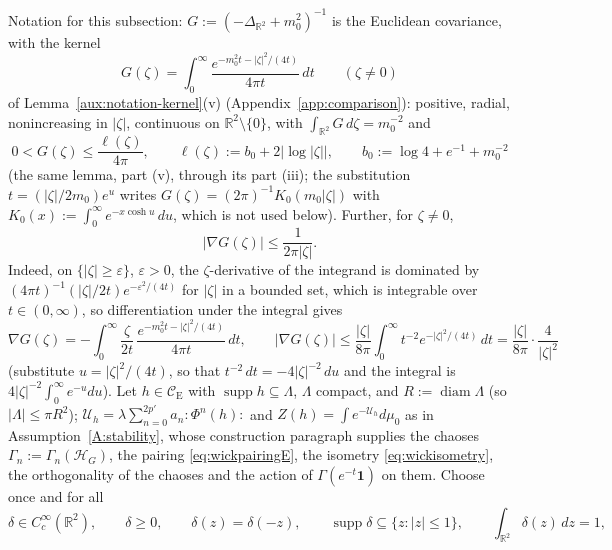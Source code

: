 \documentclass[11pt,a4paper]{article}
\theoremstyle{plain}
\theoremstyle{definition}
\theoremstyle{plain}
\theoremstyle{definition}
\newcommand{\R}{\mathbb{R}}
\newcommand{\CE}{\mathcal{C}_{\mathrm E}}
\newcommand{\HH}{\mathcal{H}}
\DeclareMathOperator{\supp}{supp}
\begin{document}
Notation for this subsection: $G:=(-\Delta_{\R^2}+m_0^2)^{-1}$ is the Euclidean
covariance, with the kernel
\[
 G(\zeta)=\int_0^\infty\frac{e^{-m_0^2t-|\zeta|^2/(4t)}}{4\pi t}\,dt\qquad(\zeta\ne0)
\]
of Lemma~\ref{aux:notation-kernel}(v) (Appendix~\ref{app:comparison}): positive, radial,
nonincreasing in $|\zeta|$, continuous on $\R^2\setminus\{0\}$, with
$\int_{\R^2}G\,d\zeta=m_0^{-2}$ and
\begin{equation}
 0<G(\zeta)\le\frac{\ell(\zeta)}{4\pi},\qquad
 \ell(\zeta):=b_0+2\bigl|\log|\zeta|\bigr|,\qquad
 b_0:=\log4+e^{-1}+m_0^{-2}
 \tag{C.a}\label{eq:Glog}
\end{equation}
(the same lemma, part (v), through its part (iii); the substitution $t=(|\zeta|/2m_0)e^{u}$ writes
$G(\zeta)=(2\pi)^{-1}K_0(m_0|\zeta|)$ with $K_0(x):=\int_0^\infty e^{-x\cosh u}\,du$,
which is not used below).  Further, for $\zeta\ne0$,
\begin{equation}
 |\nabla G(\zeta)|\le\frac1{2\pi|\zeta|} .
 \tag{C.b}\label{eq:Ggrad}
\end{equation}
Indeed, on $\{|\zeta|\ge\varepsilon\}$, $\varepsilon>0$, the $\zeta$-derivative of the
integrand is dominated by $(4\pi t)^{-1}(|\zeta|/2t)e^{-\varepsilon^2/(4t)}$ for $|\zeta|$
in a bounded set, which is integrable over $t\in(0,\infty)$, so differentiation under the
integral gives
\[
 \nabla G(\zeta)=-\int_0^\infty\frac{\zeta}{2t}\,\frac{e^{-m_0^2t-|\zeta|^2/(4t)}}{4\pi t}\,dt ,
 \qquad
 |\nabla G(\zeta)|\le\frac{|\zeta|}{8\pi}\int_0^\infty t^{-2}e^{-|\zeta|^2/(4t)}\,dt
 =\frac{|\zeta|}{8\pi}\cdot\frac4{|\zeta|^2}
\]
(substitute $u=|\zeta|^2/(4t)$, so that $t^{-2}\,dt=-4|\zeta|^{-2}\,du$ and the integral is
$4|\zeta|^{-2}\int_0^\infty e^{-u}du$).
Let $h\in\CE$ with $\supp h\subseteq\Lambda$, $\Lambda$ compact, and $R:=\operatorname{diam}
\Lambda$ (so $|\Lambda|\le\pi R^2$); $\mathcal U_h=\lambda\sum_{n=0}^{2p'}a_n{:}\Phi^n(h){:}$
and $Z(h)=\int e^{-\mathcal U_h}d\mu_0$ as in Assumption~\ref{A:stability}, whose
construction paragraph supplies the chaoses $\Gamma_n:=\Gamma_n(\HH_G)$, the pairing
\eqref{eq:wickpairingE}, the isometry \eqref{eq:wickisometry}, the orthogonality of the
chaoses and the action of $\Gamma(e^{-t}\mathbf 1)$ on them.  Choose once and
for all
\[
 \delta\in C_c^\infty(\R^2),\qquad
 \delta\ge0,\qquad \delta(z)=\delta(-z),\qquad
 \supp\delta\subseteq\{z:|z|\le1\},\qquad
 \int_{\R^2}\delta(z)\,dz=1,
\]
\end{document}

